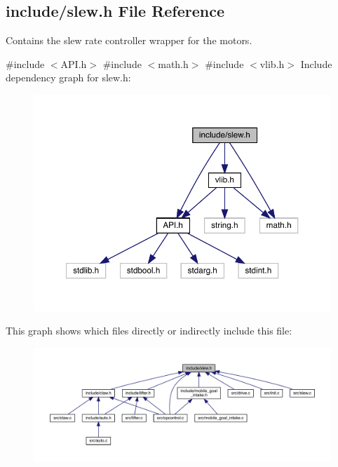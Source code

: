 \subsection{include/slew.h File Reference}
\label{slew_8h}


Contains the slew rate controller wrapper for the motors.  


{\ttfamily \#include $<$A\+P\+I.\+h$>$}\newline
{\ttfamily \#include $<$math.\+h$>$}\newline
{\ttfamily \#include $<$vlib.\+h$>$}\newline
Include dependency graph for slew.\+h\+:\nopagebreak
\begin{figure}[H]
\begin{center}
\leavevmode
\includegraphics[width=350pt]{slew_8h__incl}
\end{center}
\end{figure}
This graph shows which files directly or indirectly include this file\+:\nopagebreak
\begin{figure}[H]
\begin{center}
\leavevmode
\includegraphics[width=350pt]{slew_8h__dep__incl}
\end{center}
\end{figure}
